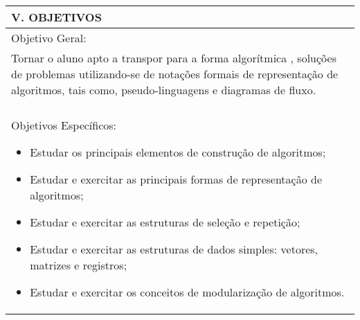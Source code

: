 \documentclass[12pt]{article}
\begin{document}
\begin{longtable}{|L{1.025\textwidth}|} \hline
%
{\bf V. OBJETIVOS } \\ \hline
%
Objetivo Geral:\\

Tornar o aluno apto a transpor para a forma algorítmica , soluções de problemas utilizando-se de notações formais de representação de algoritmos, tais como, pseudo-linguagens e diagramas de fluxo. \\
\\
Objetivos Específicos: 
\begin{itemize}
\item  Estudar os principais elementos de construção de algoritmos;
\item  Estudar e exercitar as principais formas de representação de algoritmos;
\item  Estudar e exercitar as estruturas de seleção e repetição;
\item  Estudar e exercitar as estruturas de dados simples: vetores, matrizes e registros;
\item  Estudar e exercitar os conceitos de modularização de algoritmos.
\end{itemize}
\\ \hline
\end{longtable}
\end{document}
